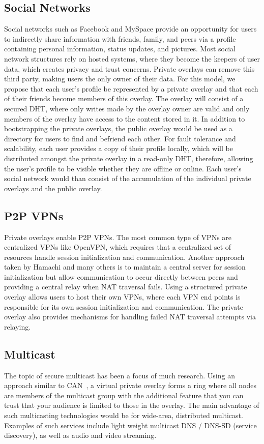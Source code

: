 \documentclass[conference]{IEEEtran}
\begin{document}
\subsection{Social Networks}
Social networks such as Facebook and MySpace provide an opportunity for users
to indirectly share information with friends, family, and peers via a profile
containing personal information, status updates, and pictures.  Most social
network structures rely on hosted systems, where they become the keepers of
user data, which creates privacy and trust concerns.  Private overlays can
remove this third party, making users the only owner of their data.  For this
model, we propose that each user's profile be represented by a private overlay
and that each of their friends become members of this overlay.  The overlay
will consist of a secured DHT, where only writes made by the overlay owner are
valid and only members of the overlay have access to the content stored in it.
In addition to bootstrapping the private overlays, the public overlay would be
used as a directory for users to find and befriend each other.  For fault
tolerance and scalability, each user provides a copy of their profile locally,
which will be distributed amongst the private overlay in a read-only DHT,
therefore, allowing the user's profile to be visible whether they are offline
or online.  Each user's social network would than consist of the accumulation
of the individual private overlays and the public overlay.

\subsection{P2P VPNs}
Private overlays enable P2P VPNs.  The most common type of VPNs are centralized
VPNs like OpenVPN, which requires that a centralized set of resources handle
session initialization and communication.  Another approach taken by Hamachi
and many others is to maintain a central server for session initialization but
allow communication to occur directly between peers and providing a central
relay when NAT traversal fails.  Using a structured private overlay allows
users to host their own VPNs, where each VPN end points is responsible for its
own session initialization and communication.  The private overlay also
provides mechanisms for handling failed NAT traversal attempts via relaying.

\subsection{Multicast}
The topic of secure multicast has been a focus of much research.  Using an
approach similar to CAN~\cite{can_multicast}, a virtual private overlay forms a
ring where all nodes are members of the multicast group with the additional
feature that you can trust that your audience is limited to those in the
overlay.  The main advantage of such multicasting technologies would be for
wide-area, distributed multicast.  Examples of such services include light
weight multicast DNS / DNS-SD (service discovery), as well as audio and video
streaming.
\end{document}
